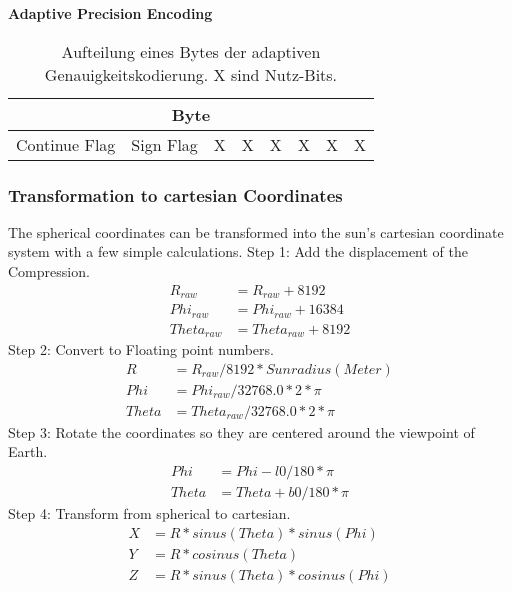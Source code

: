 \textbf{Adaptive Precision Encoding}\\
\begin{table}[!htbp]
	\center
	\begin{tabular}{|c|c|c|c||c|c|c|c|}
	\hline
	\multicolumn{8}{|c|}{Byte}\\\hline
	Continue Flag & Sign Flag & X & X & X & X & X & X \\\hline
	\end{tabular}
	\caption{Aufteilung eines Bytes der adaptiven Genauigkeitskodierung. X sind Nutz-Bits.}
	\label{anhang:format:encodings:adaptive}
\end{table}

\subsubsection*{Transformation to cartesian Coordinates} \label{anhang:format:euler}
The spherical coordinates can be transformed into the sun's cartesian coordinate system with a few simple calculations.
Step 1: Add the displacement of the Compression. 
\begin{equation}
\begin{split}
	R_{raw} &= R_{raw} + 8192\\
	Phi_{raw} &= Phi_{raw} + 16384\\
	Theta_{raw} &= Theta_{raw} + 8192
\end{split}
\end{equation}
Step 2: Convert to Floating point numbers.
\begin{equation}
\begin{split}
	R &= R_{raw} / 8192 * Sunradius (Meter)\\
	Phi &= Phi_{raw} / 32768.0 * 2 *\pi\\
	Theta &= Theta_{raw} /32768.0 * 2 *\pi
	\end{split}
\end{equation}
Step 3: Rotate the coordinates so they are centered around the viewpoint of Earth.
\begin{equation}
\begin{split}
	Phi &= Phi - l0 /180 * \pi\\
	Theta &= Theta + b0 /180 * \pi
	\end{split}
\end{equation}
Step 4: Transform from spherical to cartesian.
\begin{equation}
\begin{split}
	X &= R * sinus(Theta) * sinus(Phi)\\
	Y &= R * cosinus(Theta)\\
	Z &= R * sinus(Theta) * cosinus(Phi)
	\end{split}
\end{equation}
\pagebreak

